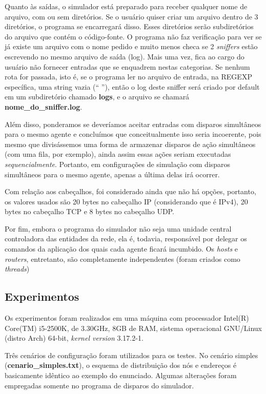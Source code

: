 \documentclass[11pt]{article}
\begin{document}
Quanto às saídas, o simulador está preparado para receber qualquer nome de arquivo, com ou sem diretórios. Se o usuário quiser criar um arquivo dentro de 3 diretórios, o programa se encarregará disso. Esses diretórios serão subdiretórios do arquivo que contém o código-fonte. O programa não faz verificação para ver se já existe um arquivo com o nome pedido e muito menos checa se 2 \textit{sniffers} estão escrevendo no mesmo arquivo de saída (log). Mais uma vez, fica ao cargo do usuário não fornecer entradas que se enquadrem nestas categorias. Se nenhum rota for passada, isto é, se o programa ler no arquivo de entrada, na REGEXP específica, uma string vazia (`` ''), então o log deste sniffer será criado por default em um subdiretório chamado \textbf{logs}, e o arquivo se chamará \textbf{nome\_do\_sniffer.log}.

Além disso, ponderamos se deveríamos aceitar entradas com disparos simultâneos para o mesmo agente e concluímos que conceitualmente isso seria incoerente, pois mesmo que divisássemos uma forma de armazenar disparos de ação simultâneos (com uma fila, por exemplo), ainda assim essas ações seriam executadas \textit{sequencialmente}. Portanto, em configurações de simulação com disparos simultâneos para o mesmo agente, apenas a última delas irá ocorrer.

Com relação aos cabeçalhos, foi considerado ainda que não há opções, portanto, os valores usados são 20 bytes no cabeçalho IP (considerando que é IPv4), 20 bytes no cabeçalho TCP e 8 bytes no cabeçalho UDP.

Por fim, embora o programa do simulador não seja uma unidade central controladora das entidades da rede, ela é, todavia, responsável por delegar os comandos da aplicação dos quais cada agente ficará incumbido. Os \textit{hosts} e \textit{routers}, entretanto, são completamente independentes (foram criados como \textit{threads})

\subsection{Experimentos}

Os experimentos foram realizados em uma máquina com processador Intel(R) Core(TM) i5-2500K, de 3.30GHz, 8GB de RAM, sistema operacional GNU/Linux (distro Arch) 64-bit, \textit{kernel version} 3.17.2-1.

Três cenários de configuração foram utilizados para os testes. No cenário simples (\textbf{cenario\_simples.txt}), o esquema de distribuição dos nós e endereços é basicamente idêntico ao exemplo do enunciado. Algumas alterações foram empregadas somente no programa de disparos do simulador.
\end{document}

